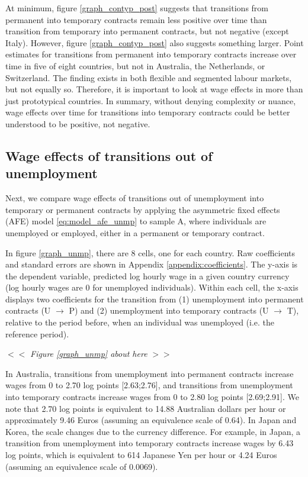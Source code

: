 \documentclass[12pt]{article}
\begin{document}
At minimum, figure \ref{graph_contyp_post} suggests that transitions from permanent into temporary contracts remain less positive over time than transition from temporary into permanent contracts, but not negative (except Italy).  However, figure \ref{graph_contyp_post} also suggests something larger.  Point estimates for transitions from permanent into temporary contracts increase over time in five of eight countries, but not in Australia, the Netherlands, or Switzerland.  The finding exists in both flexible and segmented labour markets, but not equally so.  Therefore, it is important to look at wage effects in more than just prototypical countries.  In summary, without denying complexity or nuance, wage effects over time for transitions into temporary contracts could be better understood to be positive, not negative.  

\subsection{Wage effects of transitions out of unemployment}

Next, we compare wage effects of transitions out of unemployment into temporary or permanent contracts by applying the asymmetric fixed effects (AFE) model \ref{eq:model_afe_unmp} to sample A, where individuals are unemployed or employed, either in a permanent or temporary contract.  

In figure \ref{graph_unmp}, there are 8 cells, one for each country.  Raw coefficients and standard errors are shown in Appendix \ref{appendix:coefficients}.  The y-axis is the dependent variable, predicted log hourly wage in a given country currency (log hourly wages are 0 for unemployed individuals).  Within each cell, the x-axis displays two coefficients for the transition from (1) unemployment into permanent contracts (U $\rightarrow$ P) and (2) unemployment into temporary contracts (U $\rightarrow$ T), relative to the period before, when an individual was unemployed (i.e. the reference period).  

\begin{center}
$<<$ \emph{Figure \ref{graph_unmp} about here} $>>$
\end{center}

In Australia, transitions from unemployment into permanent contracts increase wages from 0 to 2.70 log points [2.63;2.76], and transitions from unemployment into temporary contracts increase wages from 0 to 2.80 log points [2.69;2.91].  We note that 2.70 log points is equivalent to 14.88 Australian dollars per hour or approximately 9.46 Euros (assuming an equivalence scale of 0.64).  In Japan and Korea, the scale changes due to the currency difference.  For example, in Japan, a transition from unemployment into temporary contracts increase wages by 6.43 log points, which is equivalent to 614 Japanese Yen per hour or 4.24 Euros (assuming an equivalence scale of 0.0069).
\end{document}
